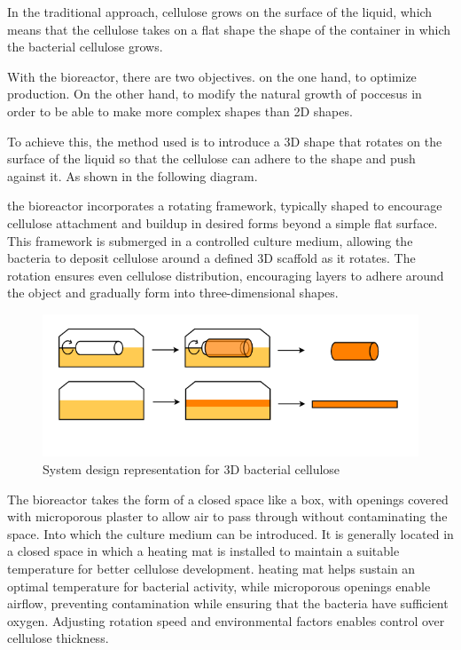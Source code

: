 In the traditional approach, cellulose grows on the surface of the liquid, which means that the cellulose takes on a flat shape \- the shape of the container in which the bacterial cellulose grows. 

With the bioreactor, there are two objectives. on the one hand, to optimize production. On the other hand, to modify the natural growth of poccesus in order to be able to make more complex shapes than 2D shapes. 

To achieve this, the method used is to introduce a 3D shape that rotates on the surface of the liquid so that the cellulose can adhere to the shape and push against it. As shown in the following diagram. 

the bioreactor incorporates a rotating framework, typically shaped to encourage cellulose attachment and buildup in desired forms beyond a simple flat surface. This framework is submerged in a controlled culture medium, allowing the bacteria to deposit cellulose around a defined 3D scaffold as it rotates. The rotation ensures even cellulose distribution, encouraging layers to adhere around the object and gradually form into three-dimensional shapes.
\begin{figure}[h]
    \centering
    \includegraphics{images/shema3Dscoby.png}
    \caption{System design representation for 3D bacterial cellulose}
    \label{fig:diagBC3D}
\end{figure} 

The bioreactor takes the form of a closed space like a box, with openings covered with microporous plaster to allow air to pass through without contaminating the space. Into which the culture medium can be introduced.
It is generally located in a closed space in which a heating mat is installed to maintain a suitable temperature for better cellulose development. 
heating mat helps sustain an optimal temperature for bacterial activity, while microporous openings enable airflow, preventing contamination while ensuring that the bacteria have sufficient oxygen. Adjusting rotation speed and environmental factors enables control over cellulose thickness.


